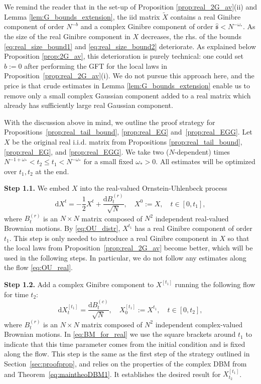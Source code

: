 \documentclass[10pt]{amsart}
\numberwithin{equation}{section}
\newcommand{\dif}{\mathrm{d}}
\begin{document}
We remind the reader that in the set-up of Proposition \ref{prop:real_2G_av}(ii) and Lemma \ref{lem:G_bounds_extension}, the iid matrix $\widetilde{X}$ contains a real Ginibre component of order $N^{-b}$ and a complex Ginibre component of order $\widehat{\mathfrak{s}}<N^{-\omega_*}$. As the size of the real Ginibre component in $X$ decreases, the rhs. of the bounds \eqref{eq:real_size_bound1} and \eqref{eq:real_size_bound2} deteriorate. As explained below Proposition \ref{prop:2G_av}, this deterioration is purely technical: one could set $b:=0$ after performing the GFT for the local laws in Proposition~\ref{prop:real_2G_av}(i). We do not pursue this approach here, and the price is that crude estimates in  Lemma \ref{lem:G_bounds_extension} enable us to remove only a small complex Gaussian component added to a real matrix which already has sufficiently large real Gaussian component. 

With the discussion above in mind, we outline the proof strategy for Propositions~\ref{prop:real_tail_bound}, \ref{prop:real_EG} and~\ref{prop:real_EGG}. Let $X$ be the original real i.i.d. matrix from Propositions \ref{prop:real_tail_bound}, \ref{prop:real_EG}, and \ref{prop:real_EGG}. We take two ($N$-dependent) times $N^{-1+\omega_*}<t_2\le t_1<N^{-\omega_*}$ for a small fixed $\omega_*>0$. All estimates will be optimized over $t_1,t_2$ at the end.

\medskip


\noindent\textbf{Step 1.1.} We embed $X$ into the real-valued Ornstein-Uhlenbeck process
\begin{equation}
\dif X^{t}=-\frac{1}{2}X^{t}+\frac{\dif B_t^{(r)}}{\sqrt{N}}, \quad X^{0}:=X,\quad t\in [0,t_1],
\label{eq:OU_real}
\end{equation}  
where $B_t^{(r)}$ is an $N\times N$ matrix composed of $N^2$ independent real-valued Brownian motions. By \eqref{eq:OU_distr}, $X^{t_1}$ has a real Ginibre component of order $t_1$. This step is only needed to introduce a real Ginibre component in $X$ so that the local laws from Proposition~\ref{prop:real_2G_av} become better, which will be used in the following steps. In particular, we do not follow any estimates along the flow \eqref{eq:OU_real}.

\medskip

\noindent\textbf{Step 1.2.} Add a complex Ginibre component to $X^{[t_1]}$ running the following flow for time $t_2$:
\begin{equation}
\dif X^{[t_1]}_t=\frac{\dif B_t^{(c)}}{\sqrt{N}},\quad X^{[t_1]}_0:=X^{t_1},\quad t\in [0,t_2],
\label{eq:BM_for_real}
\end{equation}
where $B_t^{(r)}$ is an $N\times N$ matrix composed of $N^2$ independent complex-valued Brownian motions. In \eqref{eq:BM_for_real} we use the square brackets around $t_1$ to indicate that this time parameter comes from the initial condition and is fixed along the flow.  This step is the same as the first step of the strategy outlined in Section~\ref{sec:proofprop}, and relies on the properties of the complex DBM from \cite[Proposition~4.6]{bourgade2024fluctuations} and Theorem~\ref{eq:maintheoDBM1}. It establishes the desired result for $X^{[t_1]}_{t_2}$.
\end{document}

